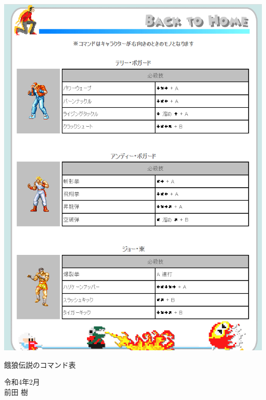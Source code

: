 \begin{clearpagefigure}
  \includegraphics[width=\linewidth,clip]{fig/GarouDensetsu.png}
  \caption{餓狼伝説のコマンド表 }
  \label{figure:GarouDensetsu}
\end{clearpagefigure}

\begin{flushright}
  令和4年2月\\
  前田 樹
\end{flushright}
